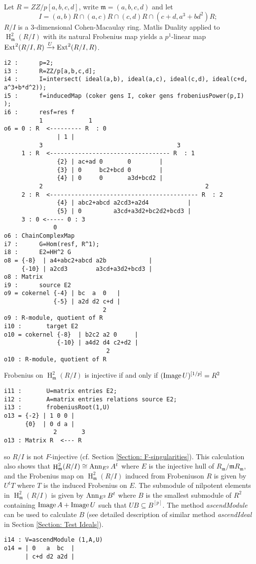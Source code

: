 \documentclass[11pt]{amsart}
\DeclareMathOperator{\HH}{H}
\begin{document}
\begin{example}
Let $R=ZZ/p[a,b,c,d]$, write $\mathfrak{m}=(a,b,c,d)$ and let
$$I= (a,b)R \cap (a,c)R \cap (c,d)R \cap (c+d, a^3+b d^2)R ;$$
$R/I$ is a $3$-dimensional Cohen-Macaulay ring.
Matlis Duality applied to $\HH^2_{\mathfrak{m}} (R/I)$ with its natural Frobenius map
yields a $p^1$-linear map $\operatorname{Ext}^2(R/ I, R) \xrightarrow{U} \operatorname{Ext}^2(R/I, R)$.

\begin{verbatim}
i2 :      p=2;
i3 :      R=ZZ/p[a,b,c,d];
i4 :      I=intersect( ideal(a,b), ideal(a,c), ideal(c,d), ideal(c+d, a^3+b*d^2));
i5 :      f=inducedMap (coker gens I, coker gens frobeniusPower(p,I) );
i6 :      resf=res f
          1             1
o6 = 0 : R  <--------- R  : 0
               | 1 |
          3                                      3
     1 : R  <---------------------------------- R  : 1
               {2} | ac+ad 0       0        |
               {3} | 0     bc2+bcd 0        |
               {4} | 0     0       a3d+bcd2 |
          2                                              2
     2 : R  <------------------------------------------ R  : 2
               {4} | abc2+abcd a2cd3+a2d4           |
               {5} | 0         a3cd+a3d2+bc2d2+bcd3 |
     3 : 0 <----- 0 : 3
              0
o6 : ChainComplexMap
i7 :      G=Hom(resf, R^1);
i8 :      E2=HH^2 G
o8 = {-8}  | a4+abc2+abcd a2b            |
     {-10} | a2cd3        a3cd+a3d2+bcd3 |
o8 : Matrix
i9 :      source E2
o9 = cokernel {-4} | bc  a  0   |
              {-5} | a2d d2 c+d |
                            2
o9 : R-module, quotient of R
i10 :       target E2
o10 = cokernel {-8}  | b2c2 a2 0     |
               {-10} | a4d2 d4 c2+d2 |
                             2
o10 : R-module, quotient of R
\end{verbatim}
Frobenius on $\HH^2_{\mathfrak{m}} (R/I)$ is injective if and only if
$(\operatorname{Image} U)^{[1/p]}=R^2$
\begin{verbatim}
i11 :       U=matrix entries E2;
i12 :       A=matrix entries relations source E2;
i13 :       frobeniusRoot(1,U)
o13 = {-2} | 1 0 0 |
      {0}  | 0 d a |
              2       3
o13 : Matrix R  <--- R
\end{verbatim}
so $R/I$ is not $F$-injective (cf. Section \ref{Section: F-singularities}).
This calculation also shows that $\HH^2_{\mathfrak{m}} (R/I)\cong \Ann_{E^2} A^t$
where $E$ is the injective hull of $R_{\mathfrak{m}}/ {\mathfrak{m}} R_{\mathfrak{m}}$,
and the Frobenius map on  $\HH^2_{\mathfrak{m}} (R/I)$ induced from Frobeniuson $R$
is given by $U^t T$ where $T$ is the induced Frobenius on $E$.
The submodule of nilpotent elements in  $\HH^2_{\mathfrak{m}} (R/I)$ is
given by $\operatorname{{Ann}}_{E^2} B^t$ where $B$ is the smallest submodule of $R^2$ containing $\operatorname{Image} A + \operatorname{Image} U$ such that $U  B \subseteq B^{[p]}$.
The method \emph{ascendModule} can be used to calculate  $B$ (see detailed description of similar method \emph{ascendIdeal} in Section \ref{Section: Test Ideals}).
\begin{verbatim}
i14 : V=ascendModule (1,A,U)
o14 = | 0   a  bc  |
      | c+d d2 a2d |
\end{verbatim}


\end{example}
\end{document}
